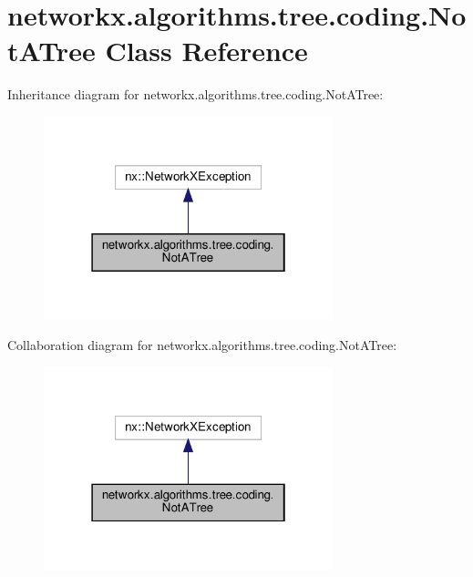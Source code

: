\hypertarget{classnetworkx_1_1algorithms_1_1tree_1_1coding_1_1NotATree}{}\section{networkx.\+algorithms.\+tree.\+coding.\+Not\+A\+Tree Class Reference}
\label{classnetworkx_1_1algorithms_1_1tree_1_1coding_1_1NotATree}


Inheritance diagram for networkx.\+algorithms.\+tree.\+coding.\+Not\+A\+Tree\+:
\nopagebreak
\begin{figure}[H]
\begin{center}
\leavevmode
\includegraphics[width=238pt]{classnetworkx_1_1algorithms_1_1tree_1_1coding_1_1NotATree__inherit__graph}
\end{center}
\end{figure}


Collaboration diagram for networkx.\+algorithms.\+tree.\+coding.\+Not\+A\+Tree\+:
\nopagebreak
\begin{figure}[H]
\begin{center}
\leavevmode
\includegraphics[width=238pt]{classnetworkx_1_1algorithms_1_1tree_1_1coding_1_1NotATree__coll__graph}
\end{center}
\end{figure}


